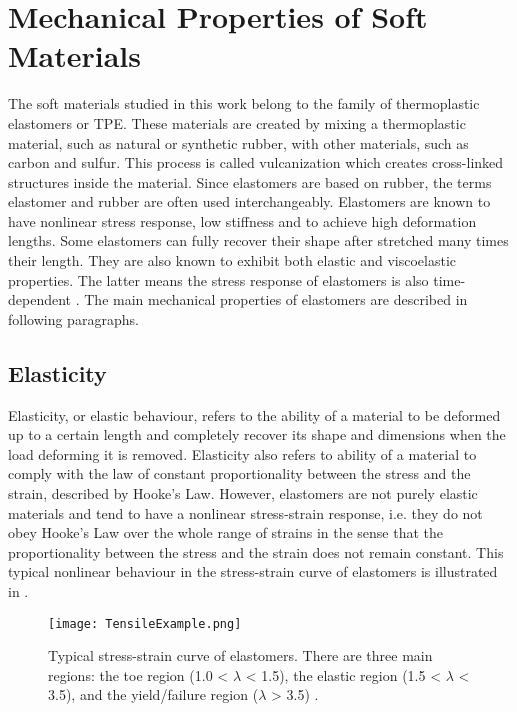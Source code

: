 \section{Mechanical Properties of Soft Materials} \label{sec:mechprop}

The soft materials studied in this work belong to the family of thermoplastic elastomers or TPE. These materials are created by mixing a thermoplastic material, such as natural or synthetic rubber, with other materials, such as carbon and sulfur. This process is called vulcanization which creates cross-linked structures inside the material. Since elastomers are based on rubber, the terms elastomer and rubber are often used interchangeably. Elastomers are known to have nonlinear stress response, low stiffness and to achieve high deformation lengths. Some elastomers can fully recover their shape after stretched many times their length. They are also known to exhibit both elastic and viscoelastic properties. The latter means the stress response of elastomers is also time-dependent \cite{Bauman2008}. The main mechanical properties of elastomers are described in following paragraphs.

\subsection{Elasticity}

Elasticity, or elastic behaviour, refers to the ability of a material to be deformed up to a certain length and completely recover its shape and dimensions when the load deforming it is removed. Elasticity also refers to ability of a material to comply with the law of constant proportionality between the stress and the strain, described by Hooke's Law. However, elastomers are not purely elastic materials and tend to have a nonlinear stress-strain response, i.e. they do not obey Hooke's Law over the whole range of strains in the sense that the proportionality between the stress and the strain does not remain constant. This typical nonlinear behaviour in the stress-strain curve of elastomers is illustrated in .

\begin{figure}[hbt!]
    \centering
    \texttt{[image: TensileExample.png]}
    \caption{Typical stress-strain curve of elastomers. There are three main regions: the toe region (1.0 < $\lambda$ < 1.5), the elastic region (1.5 < $\lambda$ < 3.5), and the yield/failure region ($\lambda$ > 3.5) \cite{Bauman2008}.}
    \label{fig:tensile}
\end{figure}

